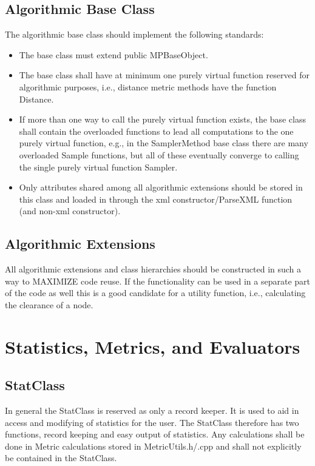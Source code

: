 \documentclass[12pt]{article}
\begin{document}
\subsection{Algorithmic Base Class}
The algorithmic base class should implement the following standards:

\begin{itemize}
\item The base class must extend public MPBaseObject.
\item The base class shall have at minimum one purely virtual function reserved for algorithmic purposes, i.e., distance
metric methods have the function Distance.
\item If more than one way to call the purely virtual function exists, the base class shall contain the overloaded
functions to lead all computations to the one purely virtual function, e.g., in the SamplerMethod base class there are
many overloaded Sample functions, but all of these eventually converge to calling the single purely virtual function
Sampler.
\item Only attributes shared among all algorithmic extensions should be stored in this class and loaded in through the
xml constructor/ParseXML function (and non-xml constructor).
\end{itemize}

\subsection{Algorithmic Extensions}
All algorithmic extensions and class hierarchies should be constructed in such a way to MAXIMIZE code reuse. If the
functionality can be used in a separate part of the code as well this is a good candidate for a utility function, i.e.,
calculating the clearance of a node.


\section{Statistics, Metrics, and Evaluators}

\subsection{StatClass}
In general the StatClass is reserved as only a record keeper. It is used to aid in access and modifying of statistics
for the user. The StatClass therefore has two functions, record keeping and easy output of statistics. Any calculations
shall be done in Metric calculations stored in MetricUtils.h/.cpp and shall not explicitly be contained in the
StatClass.
\end{document}
